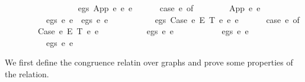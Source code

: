\begin{isabellebody}
\ \ \ \ \ \ {\isacharbar}{\kern0pt}\ {\isacharunderscore}{\kern0pt}\ \ \ \ \ \ \ \ {\isacharequal}{\kern0pt}{\isachargreater}{\kern0pt}\ {\isacharbrackleft}{\kern0pt}{\isacharbrackright}{\kern0pt}{\isacharparenright}{\kern0pt}{\isachardoublequoteclose}\isanewline
{\isacharbar}{\kern0pt}\ {\isachardoublequoteopen}egs\ {\isacharparenleft}{\kern0pt}App\ e{}{}\ e{}{}{\isacharparenright}{\kern0pt}\ e{}\ {\isacharequal}{\kern0pt}\isanewline
\ \ \ \ \ {\isacharparenleft}{\kern0pt}case\ e{}\ of\isanewline
\ \ \ \ \ \ \ \ App\ e{}{}\ e{}{}\ {\isacharequal}{\kern0pt}{\isachargreater}{\kern0pt}\isanewline
\ \ \ \ \ \ \ \ \ \ egs\ e{}{}\ e{}{}\ {\isacharat}{\kern0pt}\ egs\ e{}{}\ e{}{}\isanewline
\ \ \ \ \ \ {\isacharbar}{\kern0pt}\ {\isacharunderscore}{\kern0pt}\ {\isacharequal}{\kern0pt}{\isachargreater}{\kern0pt}\ {\isacharbrackleft}{\kern0pt}{\isacharbrackright}{\kern0pt}{\isacharparenright}{\kern0pt}{\isachardoublequoteclose}\isanewline
{\isacharbar}{\kern0pt}\ {\isachardoublequoteopen}egs\ {\isacharparenleft}{\kern0pt}Case\ e{}{}\ E{}\ T{}\ e{}{}\ e{}{}{\isacharparenright}{\kern0pt}\ e{}\ {\isacharequal}{\kern0pt}\isanewline
\ \ \ \ \ {\isacharparenleft}{\kern0pt}case\ e{}\ of\isanewline
\ \ \ \ \ \ \ \ Case\ e{}{}\ E{}\ T{}\ e{}{}\ e{}{}\ {\isacharequal}{\kern0pt}{\isachargreater}{\kern0pt}\isanewline
\ \ \ \ \ \ \ \ \ \ egs\ e{}{}\ e{}{}\ {\isacharat}{\kern0pt}\isanewline
\ \ \ \ \ \ \ \ \ \ egs\ e{}{}\ e{}{}\ {\isacharat}{\kern0pt}\isanewline
\ \ \ \ \ \ \ \ \ \ egs\ e{}{}\ e{}{}\isanewline
\ \ \ \ \ \ {\isacharbar}{\kern0pt}\ {\isacharunderscore}{\kern0pt}\ {\isacharequal}{\kern0pt}{\isachargreater}{\kern0pt}\ {\isacharbrackleft}{\kern0pt}{\isacharbrackright}{\kern0pt}{\isacharparenright}{\kern0pt}{\isachardoublequoteclose}%
\begin{isamarkuptext}%
We first define the congruence relatin over graphs
  and prove some properties of the relation.%
\end{isamarkuptext}\isamarkuptrue%
%
\begin{isamarkuptext}%

\end{isamarkuptext}
\end{isabellebody}
